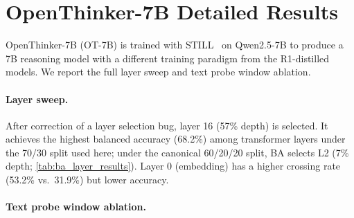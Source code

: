 \section{OpenThinker-7B Detailed Results}
\label{app:ot7b_details}

OpenThinker-7B (OT-7B) is trained with STILL~\cite{still} on Qwen2.5-7B to produce a 7B reasoning model with a different training paradigm from the R1-distilled models. We report the full layer sweep and text probe window ablation.

\paragraph{Layer sweep.}

\begin{table}[htbp]
\centering
\small
\caption{OT-7B layer sweep. Score = balanced accuracy $\times$ crossing rate. Layer 16 (57\% depth) is selected after correction; it achieves the highest balanced accuracy among transformer layers.}
\label{tab:ot7b_layer_sweep}
\setlength{\tabcolsep}{4pt}
\end{table}

After correction of a layer selection bug, layer 16 (57\% depth) is selected. It achieves the highest balanced accuracy (68.2\%) among transformer layers under the 70/30 split used here; under the canonical 60/20/20 split, BA selects L2 (7\% depth; \cref{tab:ba_layer_results}). Layer 0 (embedding) has a higher crossing rate (53.2\% vs.\ 31.9\%) but lower accuracy.

\paragraph{Text probe window ablation.}

